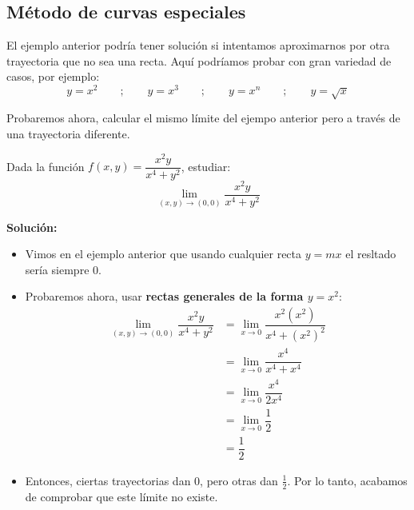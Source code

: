 \subsection{Método de curvas especiales}

El ejemplo anterior podría tener solución si intentamos aproximarnos por otra trayectoria que no sea una recta. Aquí podríamos probar con gran variedad de casos, por ejemplo:
\[
y=x^2 \qquad ; \qquad y=x^3 \qquad ; \qquad y=x^n \qquad ; \qquad y=\sqrt{x}
\]

Probaremos ahora, calcular el mismo límite del ejempo anterior pero a través de una trayectoria diferente.

\begin{ejemplo}
Dada la función $f(x,y)=\dfrac{x^2y}{x^4+y^2}$, estudiar:
\[
\lim_{(x,y)\to(0,0)}\dfrac{x^2y}{x^4+y^2}
\]
\end{ejemplo}
\textbf{Solución:}
\begin{itemize}
    \item Vimos en el ejemplo anterior que usando cualquier recta $y=mx$ el resltado sería siempre 0.
    \item Probaremos ahora, usar \textbf{rectas generales de la forma $y=x^2$}:
        \begin{align*}
        \lim_{(x,y)\to(0,0)}\dfrac{x^2y}{x^4+y^2} &=\lim_{x\to 0}\dfrac{x^2(x^2)}{x^4+(x^2)^2} \\
        &=\lim_{x\to 0} \dfrac{x^4}{x^4+x^4}\\
        &=\lim_{x\to 0} \dfrac{x^4}{2x^4}\\
        &=\lim_{x\to 0} \dfrac{1}{2}\\
        &=\dfrac{1}{2}
        \end{align*}
    \item Entonces, ciertas trayectorias dan 0, pero otras dan $\tfrac{1}{2}$. Por lo tanto, acabamos de comprobar que este límite no existe.
\end{itemize}


